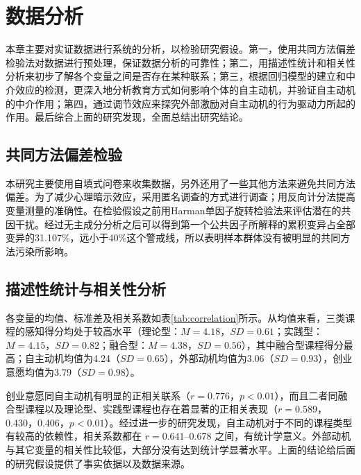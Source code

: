 \chapter{数据分析}

本章主要对实证数据进行系统的分析，以检验研究假设。第一，使用共同方法偏差检验法对数据进行预处理，保证数据分析的可靠性；第二，用描述性统计和相关性分析来初步了解各个变量之间是否存在某种联系；第三，根据回归模型的建立和中介效应的检测，更深入地分析教育方式如何影响个体的自主动机，并验证自主动机的中介作用；第四，通过调节效应来探究外部激励对自主动机的行为驱动力所起的作用。最后综合上面的研究发现，全面总结出研究结论。

\section{共同方法偏差检验}

本研究主要使用自填式问卷来收集数据，另外还用了一些其他方法来避免共同方法偏差。为了减少心理暗示效应，采用匿名调查的方式进行调查；用反向计分法提高变量测量的准确性。在检验假设之前用Harman单因子旋转检验法来评估潜在的共因干扰。经过无主成分分析之后可以得到第一个公共因子所解释的累积变异占全部变异的31.107\%，远小于40\%这个警戒线，所以表明样本群体没有被明显的共同方法污染所影响。

\section{描述性统计与相关性分析}

各变量的均值、标准差及相关系数如表\ref{tab:correlation}所示。从均值来看，三类课程的感知得分均处于较高水平\nolinebreak[3]（理论型：$M=4.18$，$SD=0.61$；实践型：$M=4.15$，$SD=0.82$；融合型：$M=4.38$，$SD=0.56$），其中融合型课程得分最高；自主动机均值为4.24\nolinebreak[3]（$SD=0.65$），外部动机均值为3.06\nolinebreak[3]（$SD=0.93$），创业意愿均值为3.79\nolinebreak[3]（$SD=0.98$）。

创业意愿同自主动机有明显的正相关联系\nolinebreak[3]（$r=0.776$，$p<0.01$），而且二者同融合型课程以及理论型、实践型课程也存在着显著的正相关表现\nolinebreak[3]（$r=0.589$，0.430，0.406，$p<0.01$）。经过进一步的研究发现，自主动机对于不同的课程类型有较高的依赖性，相关系数都在 $r=0.641$--$0.678$ 之间，有统计学意义。外部动机与其它变量的相关性比较低，大部分没有达到统计学显著水平。上面的结论给后面的研究假设提供了事实依据以及数据来源。

